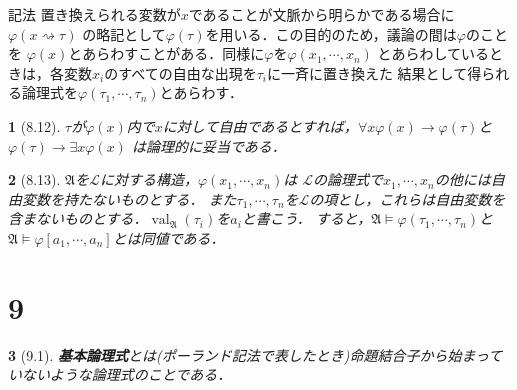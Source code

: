 \documentclass[a4j,10.5pt,oneside,openany]{jsbook}
\theoremstyle{mystyle}
\newtheorem{thm}{\color{DarkMidnightBlue}{定理}}[section]
\newtheorem{dfn}[thm]{\color{PakistanGreen}{定義}}
\newcommand{\val}{\operatorname{val}} %
\begin{document}
	\begin{itembox}[l]{記法}
		置き換えられる変数が$x$であることが文脈から明らかである場合に$\varphi(x \rightsquigarrow \tau)$
		の略記として$\varphi(\tau)$を用いる．この目的のため，議論の間は$\varphi$のことを
		$\varphi(x)$とあらわすことがある．同様に$\varphi$を$\varphi(x_{1},\cdots,x_{n})$
		とあらわしているときは，各変数$x_{i}$のすべての自由な出現を$\tau_{i}$に一斉に置き換えた
		結果として得られる論理式を$\varphi(\tau_{1},\cdots,\tau_{n})$とあらわす．
	\end{itembox}
	
	\begin{screen}
		\begin{thm}[8.12]
			$\tau$が$\varphi(x)$内で$x$に対して自由であるとすれば，$\forall x \varphi(x)
			\rightarrow \varphi(\tau)$と$\varphi(\tau) \rightarrow \exists x \varphi(x)$
			は論理的に妥当である．
		\end{thm}
	\end{screen}
	
	\begin{screen}
		\begin{thm}[8.13]
			$\mathfrak{A}$を$\mathcal{L}$に対する構造，$\varphi(x_{1},\cdots,x_{n})$は
			$\mathcal{L}$の論理式で$x_{1},\cdots,x_{n}$の他には自由変数を持たないものとする．
			また$\tau_{1},\cdots,\tau_{n}$を$\mathcal{L}$の項とし，これらは自由変数を
			含まないものとする．$\val_{\mathfrak{A}}(\tau_{i})$を$a_{i}$と書こう．
			すると，$\mathfrak{A} \models \varphi(\tau_{1},\cdots,\tau_{n})$と
			$\mathfrak{A} \models \varphi[a_{1},\cdots,a_{n}]$とは同値である．
		\end{thm}
	\end{screen}
	
\section{9}
	\begin{screen}
		\begin{dfn}[9.1]
			{\bf 基本論理式}とは(ポーランド記法で表したとき)命題結合子から始まっていないような論理式のことである．
		\end{dfn}
	\end{screen}
	
\end{document}
